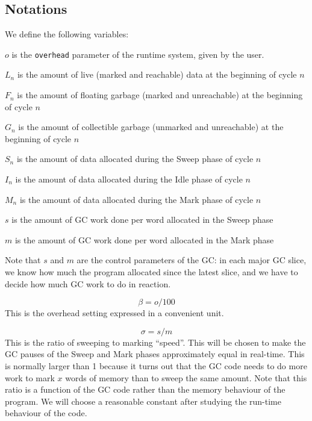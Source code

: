 \documentclass{article}
\begin{document}
\subsection{Notations}

We define the following variables:

\bigskip
$o$ is the \verb'overhead' parameter of the runtime system, given by
the user.

$L_n$ is the amount of live (marked and reachable) data at the
beginning of cycle $n$

$F_n$ is the amount of floating garbage (marked and unreachable) at
the beginning of cycle $n$

$G_n$ is the amount of collectible garbage (unmarked and unreachable)
at the beginning of cycle $n$

$S_n$ is the amount of data allocated during the Sweep phase of cycle
$n$

$I_n$ is the amount of data allocated during the Idle phase of cycle
$n$

$M_n$ is the amount of data allocated during the Mark phase of cycle
$n$

$s$ is the amount of GC work done per word allocated in the Sweep phase

$m$ is the amount of GC work done per word allocated in the Mark phase

\bigskip

Note that $s$ and $m$ are the control parameters of the GC: in each
major GC slice, we know how much the program allocated since the
latest slice, and we have to decide how much GC work to do in
reaction.

\bigskip

\begin{equation}\label{def-beta}
\beta = o/100
\end{equation}
This is the overhead setting expressed in a convenient unit.

\begin{equation}\label{def-sigma}
\sigma = s/m
\end{equation}
This is the ratio of sweeping to marking ``speed''. This
will be chosen to make the GC pauses of the Sweep and Mark phases
approximately equal in real-time. This is normally larger than 1
because it turns out that the GC code needs to do more work to mark
$x$ words of memory than to sweep the same amount. Note that this
ratio is a function of the GC code rather than the memory behaviour of
the program. We will choose a reasonable constant after studying the
run-time behaviour of the code.
\end{document}
